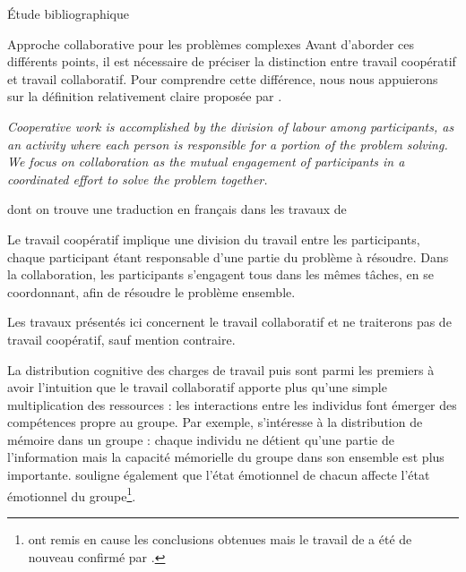 \documentclass[myfrancais,ngerman,english,frenchb]{mythesis}
\begin{document}
\begin{mychapter}{Étude bibliographique}
\begin{mysection}{Approche collaborative pour les problèmes complexes}
			Avant d'aborder ces différents points, il est nécessaire de préciser la distinction entre travail coopératif et travail collaboratif.
			Pour comprendre cette différence, nous nous appuierons sur la définition relativement claire proposée par .
			\begin{myquote}[english]
				\it Cooperative work is accomplished by the division of labour among participants, as an activity where each person is responsible for a portion of the problem solving.
				We focus on collaboration as the mutual engagement of participants in a coordinated effort to solve the problem together.
			\end{myquote}
			dont on trouve une traduction en français dans les travaux de 
			\begin{myquote}[frenchb]
				Le travail coopératif implique une division du travail entre les participants, chaque participant étant responsable d’une partie du problème à résoudre.
				Dans la collaboration, les participants s’engagent tous dans les mêmes tâches, en se coordonnant, afin de résoudre le problème ensemble.
			\end{myquote}
			Les travaux présentés ici concernent le travail collaboratif et ne traiterons pas de travail coopératif, sauf mention contraire.
			\begin{mysubsection}{La distribution cognitive des charges de travail}
				 puis  sont parmi les premiers à avoir l'intuition que le travail collaboratif apporte plus qu'une simple multiplication des ressources : les interactions entre les individus font émerger des compétences propre au groupe.
				Par exemple,  s'intéresse à la distribution de mémoire dans un groupe : chaque individu ne détient qu'une partie de l'information mais la capacité mémorielle du groupe dans son ensemble est plus importante.
				 souligne également que l'état émotionnel de chacun affecte l'état émotionnel du groupe\footnote{ ont remis en cause les conclusions obtenues mais le travail de  a été de nouveau confirmé par .}.


\end{mysubsection}
\end{mysection}
\end{mychapter}
\end{document}
